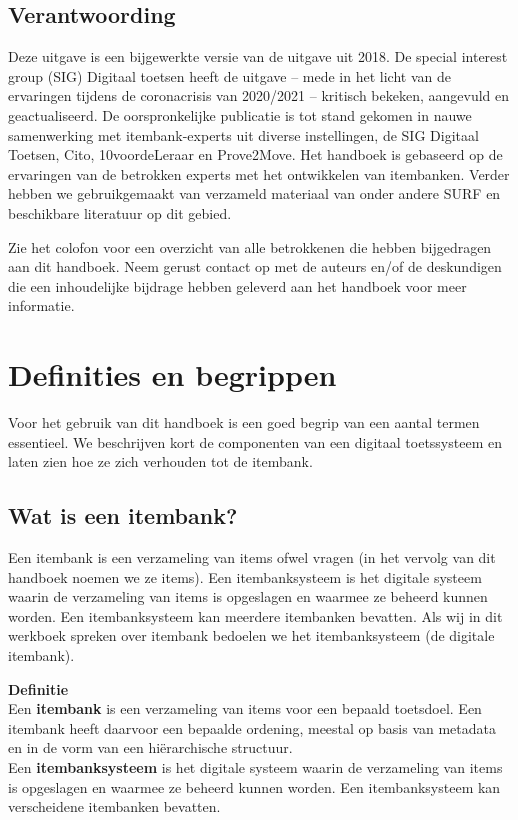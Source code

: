 \documentclass[
]{book}
\begin{document}
\hypertarget{verantwoording}{%
\subsection{Verantwoording}\label{verantwoording}}

Deze uitgave is een bijgewerkte versie van de uitgave uit 2018. De special interest group (SIG) Digitaal toetsen heeft de uitgave -- mede in het licht van de ervaringen tijdens de coronacrisis van 2020/2021 -- kritisch bekeken, aangevuld en geactualiseerd. De oorspronkelijke publicatie is tot stand gekomen in nauwe samenwerking met itembank-experts uit diverse instellingen, de SIG Digitaal Toetsen, Cito, 10voordeLeraar en Prove2Move. Het handboek is gebaseerd op de ervaringen van de betrokken experts met het ontwikkelen van itembanken. Verder hebben we gebruikgemaakt van verzameld materiaal van onder andere SURF en beschikbare literatuur op dit gebied.

Zie het colofon voor een overzicht van alle betrokkenen die hebben bijgedragen aan dit handboek. Neem gerust contact op met de auteurs en/of de deskundigen die een inhoudelijke bijdrage hebben geleverd aan het handboek voor meer informatie.

\hypertarget{definities-en-begrippen}{%
\section{Definities en begrippen}\label{definities-en-begrippen}}

Voor het gebruik van dit handboek is een goed begrip van een aantal termen essentieel. We beschrijven kort de componenten van een digitaal toetssysteem en laten zien hoe ze zich verhouden tot de itembank.

\hypertarget{wat-is-een-itembank}{%
\subsection{Wat is een itembank?}\label{wat-is-een-itembank}}

Een itembank is een verzameling van items ofwel vragen (in het vervolg van dit handboek noemen we ze items). Een itembanksysteem is het digitale systeem waarin de verzameling van items is opgeslagen en waarmee ze beheerd kunnen worden. Een itembanksysteem kan meerdere itembanken bevatten. Als wij in dit werkboek spreken over itembank bedoelen we het itembanksysteem (de digitale itembank).

\textbf{Definitie}\\
Een \textbf{itembank} is een verzameling van items voor een bepaald toetsdoel. Een itembank heeft daarvoor een bepaalde ordening, meestal op basis van metadata en in de vorm van een hiërarchische structuur.\\
Een \textbf{itembanksysteem} is het digitale systeem waarin de verzameling van items is opgeslagen en waarmee ze beheerd kunnen worden. Een itembanksysteem kan verscheidene itembanken bevatten.
\end{document}
